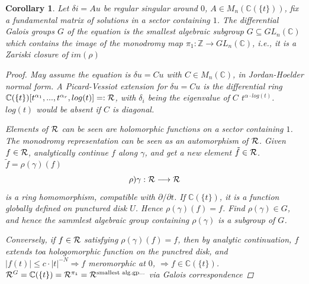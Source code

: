 \documentclass[11pt]{article}
\newtheorem{cor}[thm]{Corollary}
\newcommand{\pd}{\partial}
\newcommand{\cplx}{\mathbb C}
\newcommand{\intg}{\mathbb Z}
\newcommand{\calr}{{\cal R}}
\newcommand{\Lrta}{\Longrightarrow}
\newcommand{\lrta}{\longrightarrow}
\begin{document}
\begin{cor}
Let $\delta i= Au$ be regular singular around $0$, $A\in M_n(\cplx(\{t\}))$, fix a fundamental matrix of solutions in a sector containing $1$. The differential Galois groups $G$ of the equation is the smallest algebraic subgroup $G\subseteq GL_n(\cplx)$ which contains the image of the monodromy map $\pi_1:\intg\lrta GL_n(\cplx)$, i.e., it is a Zariski closure of  $im(\rho)$
\begin{proof}
May assume the equation is $\delta u =C u$ with $C\in M_n(\cplx)$, in Jordan-Hoelder normal form. A Picard-Vessiot extension for $\delta u= C u$ is the differential ring $\cplx(\{t\})[t^{\alpha_1},...,t^{\alpha_r},log(t)]=:\calr$, with $\delta_i$ being the eigenvalue of $C$ $t^{\alpha\cdot log(t)}$. $log(t)$ would be absent if $C$ is diagonal.  

Elements of $\calr$ can be seen are holomorphic functions on a sector containing $1$. The monodromy representation can be seen as an automorphism of $\calr$. Given $f\in\calr$, analytically continue $f$ along $\gamma$, and get a new element $\tilde{f}\in\calr$. $\tilde{f}=\rho(\gamma)(f)$ 
$$
\rho)\gamma: \calr\lrta \calr
$$
 is a ring homomorphism, compatible with $\pd/\pd t$. If $\cplx(\{t\})$, it is a function globally defined on punctured disk $U$. Hence $\rho(\gamma)(f)=f$. Find $\rho(\gamma)\in G$, and hence the sammlest algebraic group containing $\rho(\gamma)$ is a subgroup of $G$.

 Conversely, if $f\in \calr$ satisfying $\rho(\gamma)(f)=f$, then by analytic continuation, $f$ extends toa hologomorphic function on the punctred disk, and $|f(t)|\leq c\cdot |t|^{-N}\Lrta f$ meromorphic at $0$, $\Lrta f\in \cplx(\{t\})$. $\calr^G=\cplx(\{t\})=\calr^{\pi_1}=\calr^{\text{smallest alg.gp...}}$ via Galois correspondence
\end{proof}
\end{cor}
\end{document}

